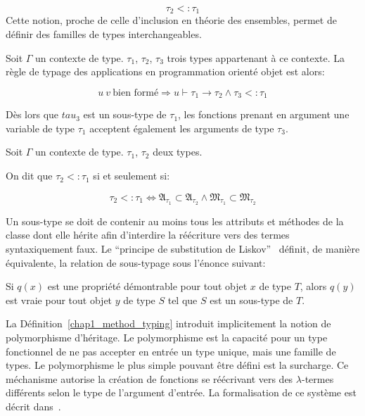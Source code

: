 \begin{equation}
  \tau_2 <: \tau_1
\end{equation}
%
%
Cette notion, proche de celle d'inclusion en théorie des ensembles,
permet de définir des familles de types interchangeables.
%
%
\begin{mydef}\label{chap1_oo_app}
  Soit $\Gamma$ un contexte de type. $\tau_1$, $\tau_2$, $\tau_3$
  trois types appartenant à ce contexte. La règle de typage des
  applications en programmation orienté objet est alors:


  \begin{equation}
    u~v~\text{bien formé} \Rightarrow u \vdash \tau_1 \rightarrow
    \tau_2 \wedge \tau_3 <: \tau_1
  \end{equation}

  Dès lors que $tau_3$ est un sous-type de $\tau_1$, les fonctions
  prenant en argument une variable de type $\tau_1$ acceptent
  également les arguments de type $\tau_3$.
\end{mydef}
%
\begin{mydef}\label{chap1_method_typing}
  Soit $\Gamma$ un contexte de type. $\tau_1$, $\tau_2$ deux types.

  On dit que $\tau_2 <: \tau_1$ si et seulement si:

  \begin{equation}
    \tau_2 <: \tau_1 \Leftrightarrow \mathfrak{A_{\tau_1}} \subset
    \mathfrak{A_{\tau_2}} \wedge \mathfrak{M_{\tau_1}} \subset
    \mathfrak{M_{\tau_2}}
  \end{equation}
\end{mydef}
%
Un sous-type se doit de contenir au moins tous les attributs et
méthodes de la classe dont elle hérite afin d'interdire la réécriture
vers des termes syntaxiquement faux. Le ``principe de substitution de
Liskov''~\citep{Liskov94familyvalues} définit, de manière équivalente,
la relation de sous-typage sous l'énonce suivant:
%
\begin{mydef}\label{chap1_liskov}
  Si $q(x)$ est une propriété démontrable pour tout objet $x$ de type
  $T$, alors $q(y)$ est vraie pour tout objet $y$ de type $S$ tel que
  $S$ est un sous-type de $T$.
\end{mydef}


La Définition~\ref{chap1_method_typing} introduit implicitement la
notion de polymorphisme d'héritage. Le polymorphisme est la capacité
pour un type fonctionnel de ne pas accepter en entrée un type unique,
mais une famille de types. Le polymorphisme le plus simple pouvant
être défini est la surcharge. Ce méchanisme autorise
la création de fonctions se réécrivant vers des $\lambda$-termes
différents selon le type de l'argument d'entrée. La formalisation de
ce système est décrit dans~\citep{Castagna95acalculus}.

